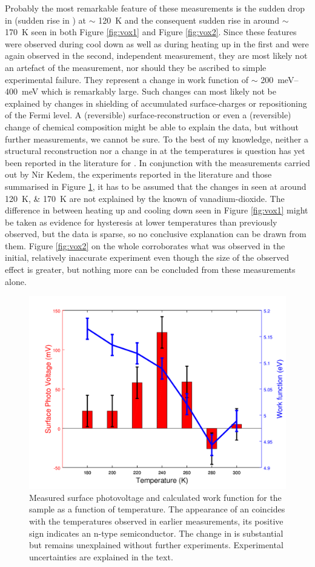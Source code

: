 Probably the most remarkable feature of these measurements is the sudden drop in \cpd{} (sudden rise in \wf{}) at $\sim$ \SI{120}{\kelvin} and the consequent sudden rise in \cpd{} around $\sim$ \SI{170}{\kelvin} seen in both Figure \ref{fig:vox1} and Figure \ref{fig:vox2}. Since these features were observed during cool down as well as during heating up in the first and were again observed in the second, independent measurement, they are most likely not an artefact of the measurement, nor should they be ascribed to simple experimental failure. They represent a change in work function of $\sim$ \SIrange{200}{400}{\milli\electronvolt} which is remarkably large. Such changes can most likely not be explained by changes in shielding of accumulated surface-charges or repositioning of the Fermi level. A (reversible) surface-reconstruction or even a (reversible) change of chemical composition might be able to explain the data, but without further measurements, we cannot be sure. To the best of my knowledge, neither a structural reconstruction nor a change in \wf{} at the temperatures is question has yet been reported in the literature for \wvadiox{}. In conjunction with the measurements carried out by Nir Kedem, the experiments reported in the literature and those summarised in Figure \ref{fig:vox3}, it has to be assumed that the changes in \wf{} seen at around \SIlist{120;170}{\kelvin} are not explained by the known \mit{} of vanadium-dioxide. The difference in \cpd{} between heating up and cooling down seen in Figure \ref{fig:vox1} might be taken as evidence for hysteresis at lower temperatures than previously observed, but the data is sparse, so no conclusive explanation can be drawn from them. Figure \ref{fig:vox2} on the whole corroborates what was observed in the initial, relatively inaccurate experiment even though the size of the observed effect is greater, but nothing more can be concluded from these measurements alone.\\
\begin{figure}
\centering
	\includegraphics[width=0.8\linewidth]{./figs/vox3}
	\caption{Measured surface photovoltage and calculated work function for the \wvadiox{} sample as a function of temperature. The appearance of an \spv{} coincides with the \mit{} temperatures observed in earlier measurements, its positive sign indicates an n-type semiconductor. The change in \wf{} is substantial but remains unexplained without further experiments. Experimental uncertainties are explained in the text.}
	\label{fig:vox3}
\end{figure}
